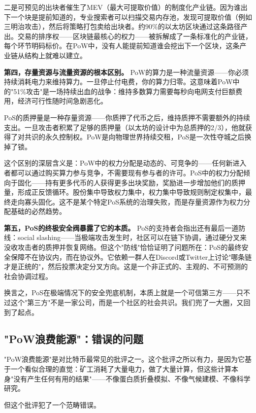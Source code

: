 \documentclass[a4paper,12pt,openany]{ctexbook}
\begin{document}
二是可预见的出块者催生了MEV（最大可提取价值）的制度化产业链。因为谁出下一个块是提前知道的，专业搜索者可以扫描交易内存池，发现可提取价值（例如三明治攻击），然后将策略打包卖给出块者。约90\%的以太坊区块通过这条路径产出。交易的排序权——区块链最核心的权力——被拆解成了一条标准化的产业链，每个环节明码标价。在PoW中，没有人能提前知道谁会挖出下一个区块，这条产业链从结构上就难以建立。

\textbf{第四，存量资源与流量资源的根本区别。} PoW的算力是一种流量资源——你必须持续消耗电力来维持算力。一旦停止付电费，你的算力归零。这意味着PoW中的"51\%攻击"是一场持续出血的战争：维持多数算力需要每秒向电网支付巨额费用，经济可行性随时间急剧恶化。

PoS的质押量是一种存量资源——你质押了代币之后，维持质押不需要额外的持续支出。一旦攻击者积累了足够的质押量（以太坊的设计中为总质押的2/3），他就获得了对共识的永久控制权。PoW是向物理世界持续交租，PoS是一次性夺城之后换掉了锁。

这个区别的深层含义是：PoW中的权力分配是动态的、可竞争的——任何新进入者都可以通过购买算力参与竞争，不需要现有参与者的许可。PoS中的权力分配倾向于固化——持有更多代币的人获得更多出块奖励，奖励进一步增加他们的质押量，形成正反馈循环。股份集中导致权力集中，权力集中导致规则制定权集中，最终走向寡头固化。这不是某个特定PoS系统的治理失败，而是存量资源作为权力分配基础的必然趋势。

\textbf{第五，PoS的终极安全阀暴露了它的本质。} PoS的支持者会指出还有最后一道防线：social slashing——当极端攻击发生时，社区可以在链下协调，通过硬分叉来没收攻击者的质押并恢复网络。但这个"防线"恰恰证明了问题所在：PoS的最终安全保障不在协议内，而在协议外。它依赖一群人在Discord或Twitter上讨论"哪条链才是正统的"，然后投票决定分叉方向。这是一个非正式的、主观的、不可预测的社会协调过程。

换言之，PoS在极端情况下的安全兜底机制，本质上就是一个可信第三方——只不过这个"第三方"不是一家公司，而是一个社区的社会共识。我们兜了一大圈，又回到了起点。


\subsection*{"PoW浪费能源"：错误的问题}


"PoW浪费能源"是对比特币最常见的批评之一。这个批评之所以有力，是因为它基于一个看似合理的直觉：矿工消耗了大量电力，做了大量计算，但这些计算本身"没有产生任何有用的结果"——不像蛋白质折叠模拟、不像气候建模、不像科学研究。

但这个批评犯了一个范畴错误。
\end{document}
